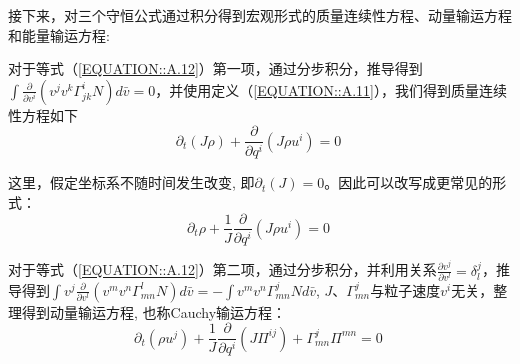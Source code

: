 \documentclass[LBMDerivation.tex]{subfiles}
\begin{document}
%
%




接下来，对三个守恒公式通过积分得到宏观形式的质量连续性方程、动量输运方程和能量输运方程:


对于等式（\ref{EQUATION::A.12}）第一项，通过分步积分，推导得到$\int\frac{\partial}{\partial v^{i}}\left( v^{j} v^{k} \Gamma_{j k}^{i} N\right)d \bar{v}=0$，并使用定义（\ref{EQUATION::A.11}），我们得到质量连续性方程如下
%
%
\begin{equation}
  \partial_{t}(J \rho)+\frac{\partial}{\partial q^{i}}\left(J \rho u^{i}\right) =0
  \label{EQUATION::A.13} ~
\end{equation}
%
%

这里，假定坐标系不随时间发生改变, 即$\partial_{t}(J)=0$。因此可以改写成更常见的形式：
%
%
\begin{equation}
  \boxed{
    \partial_{t} \rho+\frac{1}{J} \frac{\partial}{\partial q^{i}}\left(J \rho u^{i}\right)=0
  }
  \label{EQUATION::A.14} ~
\end{equation}
%
%

%
%

对于等式（\ref{EQUATION::A.12}）第二项，通过分步积分，并利用关系$\frac{\partial v^{j}}{\partial v^{l}}=\delta_{l}^{j}$，推导得到$\int v^{j}\frac{\partial}{\partial v^{l}}\left(v^{m} v^{n} \Gamma_{mn}^{l} N\right)d\bar{v}=-\int v^{m} v^{n} \Gamma_{mn}^{j} N d\bar{v}$, $J$、$\Gamma_{mn}^j$与粒子速度$v^i$无关，整理得到动量输运方程, 也称Cauchy输运方程：
%
%
\begin{equation}
  \boxed{
    \partial_{t}\left(\rho u^{j}\right)+\frac{1}{J} \frac{\partial}{\partial q^{i}}\left(J \Pi^{i j}\right)+\Gamma_{m n}^{j} \Pi^{m n}=0
  }
  \label{动量输运方程} ~
\end{equation}
%
%
\end{document}
